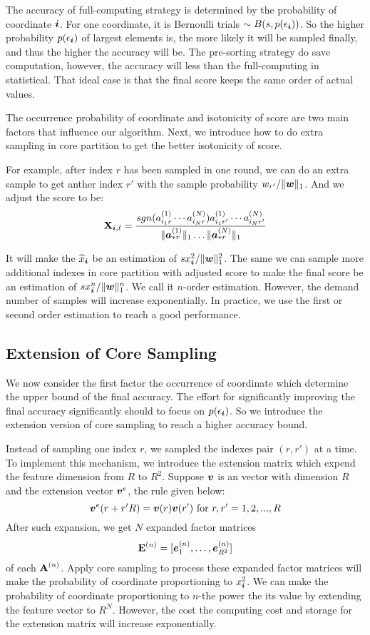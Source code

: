 \documentclass[letterpaper]{article}
\newcommand{\Sca}[3]{{#1}^{(#2)}_{i_#2#3}}%
\newcommand{\V}[1]{{\bm{{\MakeLowercase{#1}}}}}
\newcommand{\VnC}[3]{\V{#1}^{(#2)}_{#3}}
\newcommand{\Nrocl}[2]{\norm{\VnC{a}{#1}{*#2}}{1}}
\newcommand{\M}[1]{{\bm{\mathbf{\MakeUppercase{#1}}}}}
\newcommand{\norm}[2]{\|#1\|_{#2}}
\newcommand{\WreightR}{\Nrocl{1}{r}\ldots\Nrocl{N}{r}}
\newcommand{\predx}{\widehat{x}_{\V{i}}}
\begin{document}
The accuracy of full-computing strategy is determined by the probability of coordinate $\V{i}$.
For one coordinate, it is Bernoulli trials $\sim B(s,p(\epsilon_{\V{i}}))$.
So the higher probability $p(\epsilon_{\V{i}})$ of largest elements is,
the more likely it will be sampled finally,
and thus the higher the accuracy will be.
The pre-sorting strategy do save computation,
however, the accuracy will less than the full-computing in statistical.
That ideal case is that the final score keeps the same order of actual values.

The occurrence probability of coordinate and isotonicity of score are two main factors
that influence our algorithm.
Next, we introduce how to do extra sampling in core partition
to get the better isotonicity of score.

For example, after index $r$ has been sampled in one round,
we can do an extra sample to get anther index $r'$
with the sample probability $w_{r'}/\norm{\V{w}}{1}$.
And we adjust the score to be:
\[
\M{X}_{\V{i},\ell}  = \frac{sgn(\Sca{a}{1}{r}\cdots\Sca{a}{N}{r})\Sca{a}{1}{r'}\cdots\Sca{a}{N}{r'}}{\WreightR}
\]

It will make the $\predx$ be an estimation of $sx_{\V{i}}^2/\norm{\V{w}}{1}^2$.
The same we can sample more additional indexes in core partition with adjusted score
to make the final score be an estimation of $sx_{\V{i}}^n/\norm{\V{w}}{1}^n$.
We call it $n$-order estimation.
However, the demand number of samples will increase exponentially.
In practice, we use the first or second order estimation to reach a good performance.

\subsection{Extension of Core Sampling}

We now consider the first factor the occurrence of coordinate
which determine the upper bound of the final accuracy.
The effort for significantly improving the final accuracy significantly
should to focus on $p(\epsilon_{\V{i}})$.
So we introduce the extension version of core sampling to reach a higher accuracy bound.

Instead of sampling one index $r$, we sampled the indexes pair $(r,r')$ at a time.
To implement this mechanism,
we introduce the extension matrix which expend the feature dimension from $R$ to $R^2$.
Suppose $\V{v}$ is an vector with dimension $R$ and the extension vector $\V{v}^e$,
the rule given below:
\[
    \V{v}^e(r+r'R) = \V{v}(r)\V{v}(r')\ {\rm for\ }r,r' = {1,2,...,R}
\]
After such expansion, we get $N$ expanded factor matrices
\begin{equation}\label{eq:ExtensionMatrices}
    \M{E}^{(n)}=[\VnC{e}{n}{1},\ldots,\VnC{e}{n}{R^2}]
\end{equation}
of each $\M{A}^{(n)}$.
Apply core sampling to process these expanded factor matrices
will make the probability of coordinate proportioning to $x_{\V{i}}^2$.
We can make the probability of coordinate proportioning to $n$-the power the its value by extending the feature vector to $R^N$. However, the cost the computing cost and storage for the extension matrix will increase exponentially.
\end{document}
